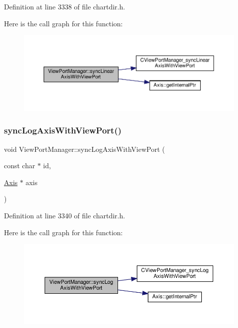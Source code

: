 Definition at line 3338 of file chartdir.\+h.

Here is the call graph for this function\+:
\nopagebreak
\begin{figure}[H]
\begin{center}
\leavevmode
\includegraphics[width=350pt]{class_view_port_manager_a0c127c218b1dabc082644d5cc95f256d_cgraph}
\end{center}
\end{figure}
\mbox{\label{class_view_port_manager_a8b2c7545c83751250c1239ec1f4e566d}} 
\subsubsection{\texorpdfstring{sync\+Log\+Axis\+With\+View\+Port()}{syncLogAxisWithViewPort()}}
{\footnotesize\ttfamily void View\+Port\+Manager\+::sync\+Log\+Axis\+With\+View\+Port (\begin{DoxyParamCaption}\item[{const char $\ast$}]{id,  }\item[{\hyperlink{class_axis}{Axis} $\ast$}]{axis }\end{DoxyParamCaption})\hspace{0.3cm}{\ttfamily [inline]}}



Definition at line 3340 of file chartdir.\+h.

Here is the call graph for this function\+:
\nopagebreak
\begin{figure}[H]
\begin{center}
\leavevmode
\includegraphics[width=350pt]{class_view_port_manager_a8b2c7545c83751250c1239ec1f4e566d_cgraph}
\end{center}
\end{figure}
\mbox{\label{class_view_port_manager_a007141f50fa8ae8ad2f80bd10c5f097f}} 
